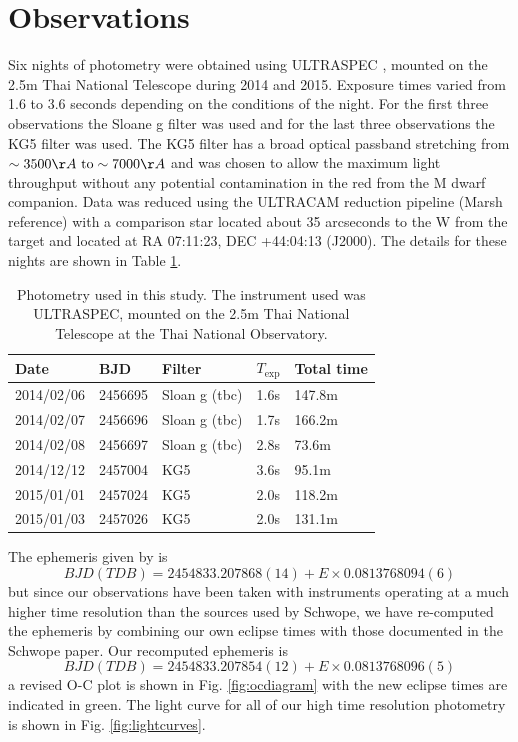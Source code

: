 \documentclass[a4paper,fleqn,usenatbib]{mnras}
\begin{document}
\section{Observations}
Six nights of photometry were obtained using ULTRASPEC \citep{ULTRASPEC}, mounted on the 2.5m Thai National Telescope during 2014 and 2015. Exposure times varied from 1.6 to 3.6 seconds depending on the conditions of the night. For the first three observations the Sloane g filter was used and for the last three observations the KG5 filter was used. The KG5 filter has a broad optical passband stretching from $\sim3500 \AA~ \mbox{to} \sim7000 \AA$ and was chosen to allow the maximum light throughput without any potential contamination in the red from the M dwarf companion.  Data was reduced using the ULTRACAM reduction pipeline (Marsh reference) with a comparison star located about 35 arcseconds to the W from the target and located at RA 07:11:23, DEC +44:04:13 (J2000). The details for these nights are shown in Table \ref{tab:photometry}. 

\begin{table}
  \caption{Photometry used in this study. The instrument used was ULTRASPEC, mounted on the 2.5m Thai National Telescope at the Thai National Observatory.}
  \begin{tabular}{ l  l  l  l  l  }
  \hline
  Date & BJD & Filter & $T_{\mbox{exp}}$& Total time \\
  \hline
    2014/02/06 & 2456695 & Sloan g (tbc)& 1.6s & 147.8m \\
    2014/02/07 & 2456696 & Sloan g (tbc)& 1.7s & 166.2m \\
    2014/02/08 & 2456697 & Sloan g (tbc)& 2.8s & 73.6m \\
    2014/12/12 & 2457004 & KG5 & 3.6s & 95.1m \\
    2015/01/01 & 2457024 & KG5 & 2.0s & 118.2m \\
    2015/01/03 & 2457026 & KG5 & 2.0s & 131.1m \\
    
  \hline
  \end{tabular}
  \label{tab:photometry}
\end{table}

The ephemeris given by \citet{Schwope2015} is 
\begin{equation}BJD(TDB) = 2454833.207868(14) + E\times0.0813768094(6)\end{equation}
but since our observations have been taken with instruments operating at a much higher time resolution than the sources used by Schwope, we have re-computed the ephemeris by combining our own eclipse times with those documented in the Schwope paper. Our recomputed ephemeris is 
\begin{equation}BJD(TDB) = 2454833.207854(12) + E\times0.0813768096(5)\label{eq:ephemeris}\end{equation}
a revised O-C plot is shown in Fig. \ref{fig:ocdiagram} with the new eclipse times are indicated in green. The light curve for all of our high time resolution photometry is shown in Fig. \ref{fig:lightcurves}.
\end{document}

